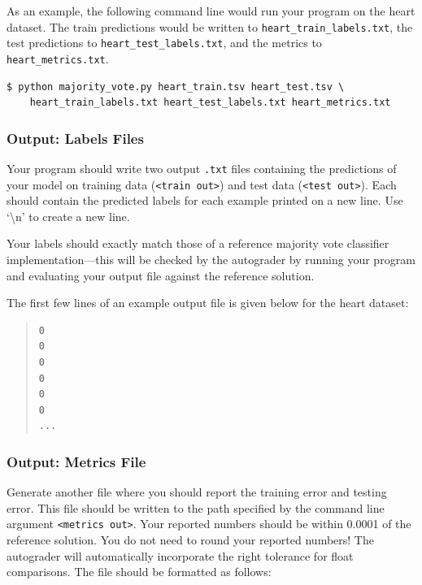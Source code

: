 \documentclass[11pt,addpoints,answers]{exam}
\begin{document}
As an example, the following command line would run your program on the heart dataset. The train predictions would be written to \lstinline{heart_train_labels.txt}, the test predictions to \lstinline{heart_test_labels.txt}, and the metrics to \lstinline{heart_metrics.txt}.
%
\begin{lstlisting}[language=Shell]
$ python majority_vote.py heart_train.tsv heart_test.tsv \ 
    heart_train_labels.txt heart_test_labels.txt heart_metrics.txt
\end{lstlisting}


\subsubsection{Output: Labels Files}
\label{sec:labels}

Your program should write two output \lstinline{.txt} files containing the predictions of your model on training data (\lstinline{<train out>}) and test data (\lstinline{<test out>}). Each should contain the predicted labels for each example printed on a new line. Use `\textbackslash n' to create a new line.

Your labels should exactly match those of a reference majority vote classifier implementation---this will be checked by the autograder by running your program and evaluating your output file against the reference solution.

%
The first few lines of an example output file is given below for the heart dataset:
\begin{quote}
\begin{verbatim}
0
0
0
0
0
0
...
\end{verbatim}
\end{quote}

\subsubsection{Output: Metrics File}
\label{sec:metrics}

Generate another file where you should report the training error and testing error. This file should be written to the path specified by the command line argument \lstinline{<metrics out>}. Your reported numbers should be within 0.0001 of the reference solution. You do not need to round your reported numbers! The autograder will automatically incorporate the right tolerance for float comparisons. The file should be formatted as follows:
\end{document}
